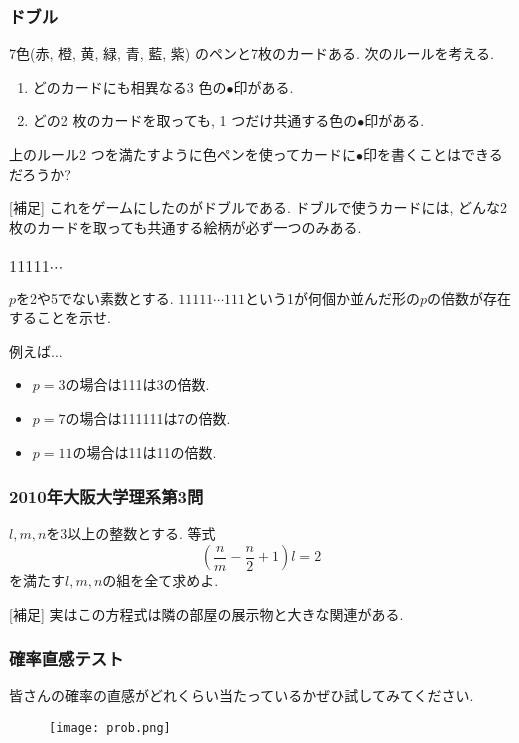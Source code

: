 \documentclass[11pt,dvipdfmx]{beamer}
\theoremstyle{definition}
\theoremstyle{remark}
\begin{document}
\begin{frame}
\frametitle{ドブル}
7色(赤, 橙, 黄, 緑, 青, 藍, 紫) のペンと7枚のカードある. 次のルールを考える.
\begin{enumerate}
    \setlength{\parskip}{0cm} 
  \setlength{\itemsep}{0cm} 
\item どのカードにも相異なる3 色の$\bullet$印がある.
\item どの2 枚のカードを取っても, 1 つだけ共通する色の$\bullet$印がある.
\end{enumerate}
上のルール2 つを満たすように色ペンを使ってカードに$\bullet$印を書くことはできるだろうか?

\vspace{20pt}
{\footnotesize
[補足] これをゲームにしたのがドブルである. ドブルで使うカードには, どんな2枚のカードを取っても共通する絵柄が必ず一つのみある. 
}

\end{frame}

\begin{frame}
\frametitle{$11111\cdots $}
$p$を2や5でない素数とする. 
$11111\cdots 111$という1が何個か並んだ形の$p$の倍数が存在することを示せ.

\vspace{20pt}
例えば...
\begin{itemize}
  \item $p=3$の場合は111は3の倍数.
  \item $p=7$の場合は111111は7の倍数.
  \item $p=11$の場合は11は11の倍数.
  \end{itemize}
\end{frame}


\begin{frame}
\frametitle{2010年大阪大学理系第3問}
$l,m,n$を3以上の整数とする. 等式
$$
\left( \frac{n}{m} - \frac{n}{2} + 1 \right)l = 2
$$
を満たす$l,m,n$の組を全て求めよ. 

\vspace{20pt}
{\footnotesize
[補足] 実はこの方程式は隣の部屋の展示物と大きな関連がある. 
}
\end{frame}

\begin{frame}
\frametitle{確率直感テスト}

皆さんの確率の直感がどれくらい当たっているかぜひ試してみてください. 

\begin{figure}[htbp]
\begin{center}
\texttt{[image: prob.png]}
\end{center}
\end{figure}
\end{frame}
\end{document}
